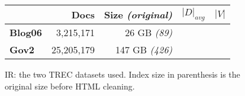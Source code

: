 \begin{figure}
\centering
{\small
\begin{tabular}{|l|r|r|r|r|}
    \hline & \textbf{Docs} & \textbf{Size} \emph{(original)} & \textbf{$|D|_{avg}$} &
    \textbf{$|V|$} \\
    \hline
    \textbf{Blog06} & 3,215,171 & 26 GB \emph{(89)} & & \\
    \textbf{Gov2} & 25,205,179 & 147 GB \emph{(426)} & & \\
    \hline
\end{tabular}
\caption{IR: the two TREC datasets used. Index size in parenthesis is the
original size before HTML cleaning.}
}
\label{fig:ir-datasets}
\end{figure}
